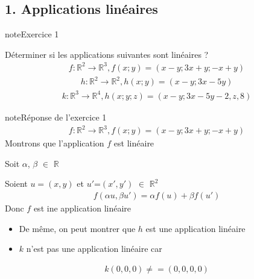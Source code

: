 \documentclass[letterpaper,10pt,french]{jupyterBook}
\begin{document}
\subsection{1. Applications linéaires}
\label{\detokenize{S_xe9rie2:applications-lineaires}}
\begin{sphinxadmonition}{note}{Exercice 1}

\sphinxAtStartPar
Déterminer si les applications suivantes sont linéaires ?
\begin{equation*}
\begin{split}
f : \mathbb{R}^2 \rightarrow \mathbb{R}^3, f(x; y) = (x - y; 3x + y; -x + y )
\end{split}
\end{equation*}\begin{equation*}
\begin{split}
h : \mathbb{R}^2 \rightarrow \mathbb{R}^2, h(x; y) = (x - y; 3x -5y )
\end{split}
\end{equation*}\begin{equation*}
\begin{split}
k : \mathbb{R}^3 \rightarrow \mathbb{R}^4, h(x; y; z) = (x - y; 3x -5y-2, z, 8 )
\end{split}
\end{equation*}\end{sphinxadmonition}

\begin{sphinxadmonition}{note}{Réponse de l’exercice 1}
\begin{equation*}
\begin{split}
f : \mathbb{R}^2 \rightarrow \mathbb{R}^3, f(x; y) = (x - y; 3x + y; -x + y )
\end{split}
\end{equation*}
\sphinxAtStartPar
Montrons que l’application \(f\) est linéaire

\sphinxAtStartPar
Soit \(\alpha\), \(\beta\) \(\in\) \(\mathbb{R}\)

\sphinxAtStartPar
Soient \(u =(x,y)\) et \(u'\)=\((x',y')\) \(\in\) \(\mathbb{R}^2\)
\begin{equation*}
\begin{split}
f(\alpha u, \beta u') = \alpha f(u) + \beta f(u')
\end{split}
\end{equation*}
\sphinxAtStartPar
Donc \(f\) est ine application linéaire
\begin{itemize}
\item {} 
\sphinxAtStartPar
De même, on peut montrer que \(h\) est une application linéaire

\item {} 
\sphinxAtStartPar
\(k\) n’est pas une application linéaire car

\end{itemize}
\begin{equation*}
\begin{split}
k(0,0,0) \neq = (0,0,0,0)
\end{split}
\end{equation*}\end{sphinxadmonition}
\end{document}
